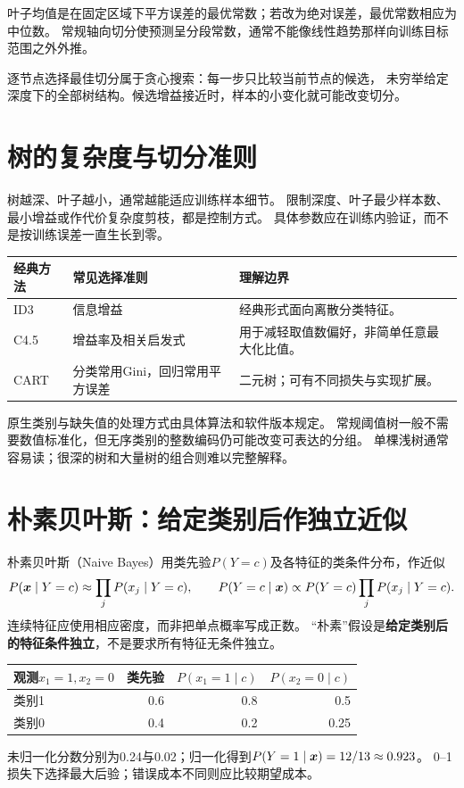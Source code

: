 叶子均值是在固定区域下平方误差的最优常数；若改为绝对误差，最优常数相应为中位数。
常规轴向切分使预测呈分段常数，通常不能像线性趋势那样向训练目标范围之外外推。

逐节点选择最佳切分属于贪心搜索：每一步只比较当前节点的候选，
未穷举给定深度下的全部树结构。候选增益接近时，样本的小变化就可能改变切分。

\section{树的复杂度与切分准则}
\label{sec:tree-control}
树越深、叶子越小，通常越能适应训练样本细节。
限制深度、叶子最少样本数、最小增益或作代价复杂度剪枝，都是控制方式。
具体参数应在训练内验证，而不是按训练误差一直生长到零。

\begin{center}
\begin{tabularx}{\textwidth}{P{25mm}P{44mm}Y}
\toprule
经典方法 & 常见选择准则 & 理解边界\\
\midrule
ID3 & 信息增益 & 经典形式面向离散分类特征。\\
C4.5 & 增益率及相关启发式 & 用于减轻取值数偏好，非简单任意最大化比值。\\
CART & 分类常用Gini，回归常用平方误差 & 二元树；可有不同损失与实现扩展。\\
\bottomrule
\end{tabularx}
\end{center}

原生类别与缺失值的处理方式由具体算法和软件版本规定。
常规阈值树一般不需要数值标准化，但无序类别的整数编码仍可能改变可表达的分组。
单棵浅树通常容易读；很深的树和大量树的组合则难以完整解释。


\section{朴素贝叶斯：给定类别后作独立近似}
\label{sec:tree-naive-bayes}
朴素贝叶斯（Naive Bayes）用类先验$P(Y=c)$及各特征的类条件分布，作近似
\[
 P(\boldsymbol{x}\mid Y=c)\approx\prod_jP(x_j\mid Y=c),\qquad
 P(Y=c\mid\boldsymbol{x})\propto P(Y=c)\prod_jP(x_j\mid Y=c).
\]
连续特征应使用相应密度，而非把单点概率写成正数。
“朴素”假设是\textbf{给定类别后的特征条件独立}，不是要求所有特征无条件独立。

\begin{center}
\begin{tabular}{lrrr}
\toprule
观测$x_1=1,x_2=0$ & 类先验 & $P(x_1=1\mid c)$ & $P(x_2=0\mid c)$\\
\midrule
类别1 & 0.6 & 0.8 & 0.5\\
类别0 & 0.4 & 0.2 & 0.25\\
\bottomrule
\end{tabular}
\end{center}
未归一化分数分别为0.24与0.02；归一化得到$P(Y=1\mid\boldsymbol{x})=12/13\approx0.923$。
0--1损失下选择最大后验；错误成本不同则应比较期望成本。

